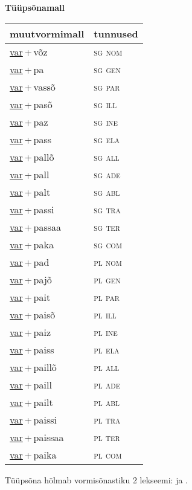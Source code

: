 
\vspace{1.8em}
\begin{minipage}{\textwidth}
\textbf{Tüüpsõnamall \,}\\

\begin{sideways}
\begin{tabular}{l l}
muutvormimall & tunnused \\
\hline
\underline{var}\,+\,võz & \textsc{ sg nom } \\
\underline{var}\,+\,pa & \textsc{ sg gen } \\
\underline{var}\,+\,vassõ & \textsc{ sg par } \\
\underline{var}\,+\,pasõ & \textsc{ sg ill } \\
\underline{var}\,+\,paz & \textsc{ sg ine } \\
\underline{var}\,+\,pass & \textsc{ sg ela } \\
\underline{var}\,+\,pallõ & \textsc{ sg all } \\
\underline{var}\,+\,pall & \textsc{ sg ade } \\
\underline{var}\,+\,palt & \textsc{ sg abl } \\
\underline{var}\,+\,passi & \textsc{ sg tra } \\
\underline{var}\,+\,passaa & \textsc{ sg ter } \\
\underline{var}\,+\,paka & \textsc{ sg com } \\
\underline{var}\,+\,pad & \textsc{ pl nom } \\
\underline{var}\,+\,pajõ & \textsc{ pl gen } \\
\underline{var}\,+\,pait & \textsc{ pl par } \\
\underline{var}\,+\,paisõ & \textsc{ pl ill } \\
\underline{var}\,+\,paiz & \textsc{ pl ine } \\
\underline{var}\,+\,paiss & \textsc{ pl ela } \\
\underline{var}\,+\,paillõ & \textsc{ pl all } \\
\underline{var}\,+\,paill & \textsc{ pl ade } \\
\underline{var}\,+\,pailt & \textsc{ pl abl } \\
\underline{var}\,+\,paissi & \textsc{ pl tra } \\
\underline{var}\,+\,paissaa & \textsc{ pl ter } \\
\underline{var}\,+\,paika & \textsc{ pl com } \\
\end{tabular}
\end{sideways}
\label{tab:tüüpsõnamall-varvõz}

\end{minipage}

 
\vspace{1em}
\noindent Tüüpsõna hõlmab vormisõnastiku 2 lekseemi:  ja .
